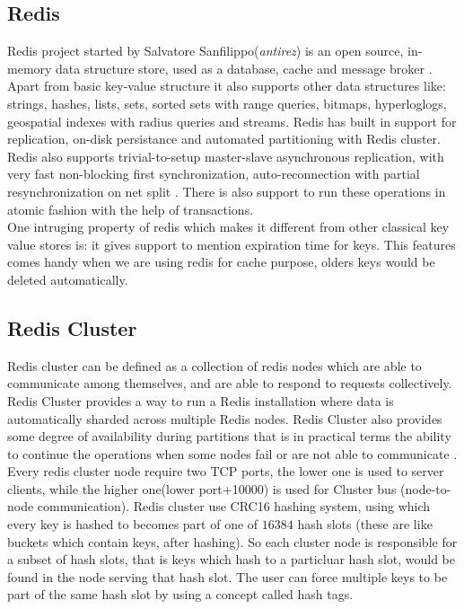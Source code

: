 \documentclass[11pt]{article}
\begin{document}
\subsection*{Redis}
Redis project started by Salvatore Sanfilippo(\textit{antirez}) is
an open source, in-memory data structure store,
used as a database, cache and message broker \cite{redis}.
Apart from basic key-value structure it also supports other data structures like:
strings, hashes, lists, sets, sorted sets with range queries, bitmaps,
hyperloglogs, geospatial indexes with radius queries and streams. Redis has built in
support for replication, on-disk persistance and automated partitioning with Redis cluster.
Redis also supports trivial-to-setup master-slave asynchronous
replication, with very fast non-blocking first synchronization, auto-reconnection
with partial resynchronization on net split \cite{redis}.
There is also support to run these operations in atomic fashion with the help
of transactions.
\\

One intruging property of redis which makes it different from other classical key
value stores is: it gives support to mention expiration time for keys. This features
comes handy when we are using redis for cache purpose, olders keys would be deleted automatically.

\pagebreak

\subsection*{Redis Cluster}
Redis cluster can be defined as a collection of redis nodes which are able to communicate
among themselves, and are able to respond to requests collectively.
Redis Cluster provides a way to run a Redis installation where
data is automatically sharded across multiple Redis nodes.
Redis Cluster also provides some degree of availability during partitions
that is in practical terms the ability to continue the operations when
some nodes fail or are not able to communicate \cite{redis}.
\\

Every redis cluster node require two TCP ports, the lower one is used to server clients,
while the higher one(lower port+10000) is used for Cluster bus (node-to-node communication).
Redis cluster use CRC16 hashing system, using which every key is hashed to
becomes part of one of $16384$ hash slots (these are like buckets 
which contain keys, after hashing). So each cluster node is
responsible for a subset of hash slots, that is keys which hash to a particluar
hash slot, would be found in the node serving that hash slot.
The user can force multiple keys to be part of the same hash slot
by using a concept called hash tags.
\end{document}
